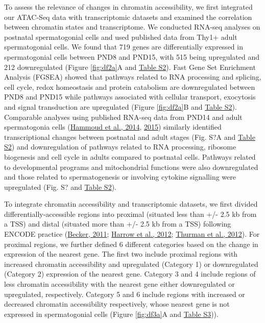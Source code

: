 \documentclass[12pt,twoside]{reedthesis}
\begin{document}
To assess the relevance of changes in chromatin accessibility, we first
integrated our ATAC-Seq data with transcriptomic datasets and examined
the correlation between chromatin states and transcriptome. We conducted
RNA-seq analyses on postnatal spermatogonial cells and used published
data from Thy1+ adult spermatogonial cells. We found that 719 genes are
differentially expressed in spermatogonial cells between PND8 and PND15,
with 515 being upregulated and 212 downregulated (Figure \ref{fig:df2a}A and \protect\hyperlink{st}{Table S2}).
Fast Gene Set Enrichment Analysis (FGSEA) showed that pathways related
to RNA processing and splicing, cell cycle, redox homeostasis and
protein catabolism are downregulated between PND8 and PND15 while
pathways associated with cellular transport, exocytosis and signal
transduction are upregulated (Figure \ref{fig:df2a}B and \protect\hyperlink{st}{Table S2}). Comparable analyses
using published RNA-seq data from PND14 and adult spermatogonia cells
(\protect\hyperlink{ref-hammoud2014}{Hammoud et al., 2014}, \protect\hyperlink{ref-hammoud2015}{2015}) similarly identified transcriptional
changes between postnatal and adult stages (Fig. S?A and \protect\hyperlink{st}{Table S2}) and
downregulation of pathways related to RNA processing, ribosome
biogenesis and cell cycle in adults compared to postnatal cells.
Pathways related to developmental programs and mitochondrial functions
were also downregulated and those related to spermatogenesis or
involving cytokine signalling were upregulated (Fig. S? and \protect\hyperlink{st}{Table S2}).

To integrate chromatin accessibility and transcriptomic datasets, we
first divided differentially-accessible regions into proximal (situated
less than +/- 2.5 kb from a TSS) and distal (situated more than +/- 2.5
kb from a TSS) following ENCODE practice (\protect\hyperlink{ref-ausers2011}{Becker, 2011}; \protect\hyperlink{ref-harrow2012}{Harrow et al., 2012}; \protect\hyperlink{ref-thurman2012}{Thurman et al., 2012}). For proximal regions, we further defined 6 different
categories based on the change in expression of the nearest gene. The
first two include proximal regions with increased chromatin
accessibility and upregulated (Category 1) or downregulated (Category 2)
expression of the nearest gene. Category 3 and 4 include regions of less
chromatin accessibility with the nearest gene either downregulated or
upregulated, respectively. Category 5 and 6 include regions with
increased or decreased chromatin accessibility respectively, whose
nearest gene is not expressed in spermatogonial cells (Figure \ref{fig:df3a}A and \protect\hyperlink{st}{Table S3})).
\end{document}
